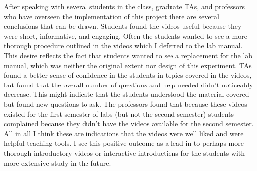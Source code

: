 \documentclass{article}
\begin{document}
After speaking with several students in the class, graduate TAs, and professors who have overseen the implementation of this project there are several conclusions that can be drawn. Students found the videos useful because they were short, informative, and engaging. Often the students wanted to see a more thorough procedure outlined in the videos which I deferred to the lab manual. This desire reflects the fact that students wanted to see a replacement for the lab manual, which was neither the original extent nor design of this experiment. TAs found a better sense of confidence in the students in topics covered in the videos, but found that the overall number of questions and help needed didn't noticeably decrease. This might indicate that the students understood the material covered but found new questions to ask. The professors found that because these videos existed for the first semester of labs (but not the second semester) students complained because they didn't have the videos available for the second semester. All in all I think these are indications that the videos were well liked and were helpful teaching tools. I see this positive outcome as a lead in to perhaps more thorough introductory videos or interactive introductions for the students with more extensive study in the future. 
\end{document}
